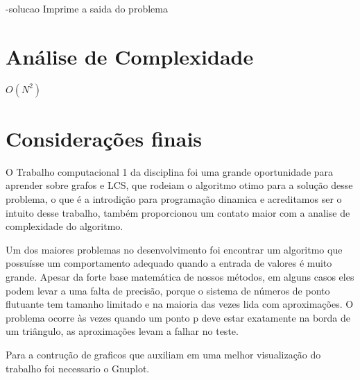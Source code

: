 \documentclass[12pt,a4paper]{article}
\begin{document}
-solucao
Imprime a saida do problema

\section{Análise de Complexidade}

$O(N^2)$

\section{Considerações finais}

O Trabalho computacional 1 da disciplina foi uma grande oportunidade para aprender sobre grafos e LCS, que rodeiam o algoritmo otimo para a solução desse problema, o que é a introdição para programação dinamica e acreditamos ser o intuito desse trabalho, também proporcionou um contato maior com a analise de complexidade do algoritmo. 

Um dos maiores problemas no desenvolvimento foi encontrar um algoritmo que possuísse um comportamento adequado quando a entrada de valores é muito grande. Apesar da forte base matemática de nossos métodos, em alguns casos eles podem levar a uma falta de precisão, porque o sistema de números de ponto flutuante tem tamanho limitado e na maioria das vezes lida com aproximações. O problema ocorre às vezes quando um ponto p deve estar exatamente na borda de um triângulo, as aproximações levam a falhar no teste. 

Para a contrução de graficos que auxiliam em uma melhor visualização do trabalho foi necessario o Gnuplot.


\begin{flushleft}
	\nocite{*}
	
\end{flushleft}
\end{document}
